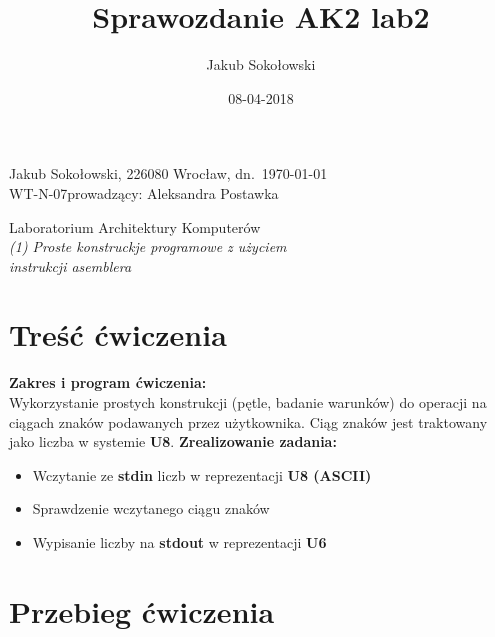 \documentclass[11pt]{report}
\title{Sprawozdanie AK2 lab2}file:///home/jakub/Documents/Studia/Urlop_2/AK2/lab/sprawozdania/ak2_projekt.tex
\date{08-04-2018}
\author{Jakub Sokołowski}
\newcommand{\LabNum}{1}
\begin{document}
\noindent
  Jakub Sokołowski, 226080
  \hfill Wrocław, dn.\ {\AdvanceDate[-1]\today}\\
\hfill
\noindent
WT-N-07\hfill  prowadzący: Aleksandra Postawka\\
\vspace{1cm}
\begin{center}
  \begin{Large}
  	Laboratorium Architektury Komputerów\\
    \emph{(\LabNum) Proste konstruckje programowe z użyciem\\
    instrukcji asemblera}
  \end{Large}
\end{center}


\section{Treść ćwiczenia}
\label{sec:tresc-cwiczenia}
\textbf{Zakres i program ćwiczenia:}\\
Wykorzystanie prostych konstrukcji (pętle, badanie warunków) do operacji na ciągach znaków podawanych przez użytkownika. Ciąg znaków jest traktowany jako liczba w systemie \textbf{U8}.
\textbf{Zrealizowanie zadania:}
\begin{itemize}[leftmargin=*]
	\item Wczytanie ze \textbf{stdin} liczb w reprezentacji \textbf{ U8 (ASCII)}
	\item Sprawdzenie wczytanego ciągu znaków
	\item Wypisanie liczby na \textbf{stdout} w reprezentacji \textbf{U6}
\end{itemize}
\section{Przebieg ćwiczenia}
\label{sec:przebieg-cwiczenia}
\end{document}
